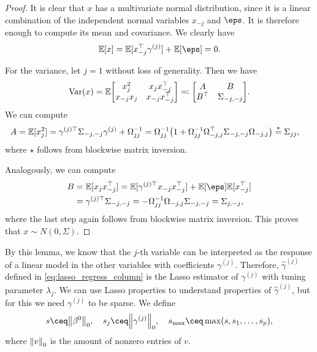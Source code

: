\begin{proof}
	It is clear that $x$ has a multivariate normal distribution, since it is a linear combination of the independent normal variables $x_{-j}$ and $\eps$. It is therefore enough to compute its mean and covariance. We clearly have
	\[
	\EE[x] = \EE[x_{-j}\T \gamma^{(j)}] + \EE[\eps] = 0.
	\]
	
	For the variance, let $j = 1$ without loss of generality. 
%	
	Then we have
	\[
	\Var(x) = \EE\mqty[x_j^2 & x_j x_{-j}\T  \\
	x_{-j} x_j & x_{-j} x_{-j}\T] \eqqcolon \mqty[ A & B \\ B\T & \Sigma_{-j, -j}]. 
	\]
	We can compute 
	\begin{align*}
		A &= \mathbb E[x_j^2] = \gamma^{(j)\top} \Sigma_{-j, -j} \gamma^{(j)} + \Omega_{jj}^{-1} = \Omega_{jj}^{-1} \qty(1 + \Omega_{jj}^{-1} \Omega_{-j, j}^\top \Sigma_{-j, -j} \Omega_{-j, j}) \overset\star= \Sigma_{jj},
	\end{align*}
where $\star$ follows from blockwise matrix inversion. 

Analogously, we can compute 
\begin{align*}
	B &= \EE[x_j x_{-j}\T] = \EE[\gamma^{(j)\top} x_{-j} x_{-j}\T] + \EE[\eps] \EE[x_{-j}\T] \\
	&= \gamma^{(j)\top} \Sigma_{-j, -j} = -\Omega_{jj}^{-1} \Omega_{-j, j} \Sigma_{-j, -j} = \Sigma_{j, -j},
\end{align*}
where the last step again follows from blockwise matrix inversion.
This proves that $x \sim N(0, \Sigma)$. 
\end{proof}

By this lemma, we know that the $j$-th variable can be interpreted as the response of a linear model in the other variables with coefficients $\gamma^{(j)}$. Therefore, $\hat\gamma^{(j)}$ defined in \cref{eq:lasso_regress_column} is the Lasso estimator of $\gamma^{(j)}$ with tuning parameter $\lambda_j$. We can use Lasso properties to understand properties of $\hat\gamma^{(j)}$, but for this we need $\gamma^{(j)}$ to be sparse. We define
\[
s \ceq \norm{\beta^0}_0, \quad s_j \ceq \norm{\gamma^{(j)}}_0, \quad s_\Rm{max} \ceq \max(s, s_1, \dotsc, s_p),
\]
where $\norm{v}_0$ is the amount of nonzero entries of $v$. 

